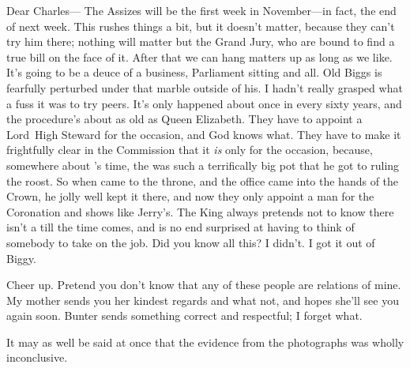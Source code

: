 \begin{mail}{}{Dear Charles---}
The Assizes will be the first week in November—in fact, the end of next week. This rushes things a bit, but it doesn't matter, because they can't try him there; nothing will matter but the Grand Jury, who are bound to find a true bill on the face of it. After that we can hang matters up as long as we like. It's going to be a deuce of a business, Parliament sitting and all. Old Biggs is fearfully perturbed under that marble outside of his. I hadn't really grasped what a fuss it was to try peers. It's only happened about once in every sixty years, and the procedure's about as old as Queen Elizabeth. They have to appoint a Lord~High Steward for the occasion, and God knows what. They have to make it frightfully clear in the Commission that it \emph{is} only for the occasion, because, somewhere about 's time, the  was such a terrifically big pot that he got to ruling the roost. So when  came to the throne, and the office came into the hands of the Crown, he jolly well kept it there, and now they only appoint a man  for the Coronation and shows like Jerry's. The King always pretends not to know there isn't a  till the time comes, and is no end surprised at having to think of somebody to take on the job. Did you know all this? I didn't. I got it out of Biggy.


Cheer up. Pretend you don't know that any of these people are relations of mine. My mother sends you her kindest regards and what not, and hopes she'll see you again soon. Bunter sends something correct and respectful; I forget what.

\begin{a4}
	\enlargethispage{\baselineskip}
\end{a4}

\end{mail}


It may as well be said at once that the evidence from the photographs was wholly inconclusive.
